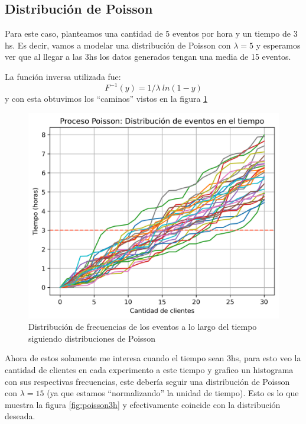 \documentclass[baaa]{baaa}
\begin{document}
\subsection{Distribución de Poisson}
Para este caso, planteamos una cantidad de 5 eventos por hora y un tiempo de 3 hs.
Es decir, vamos a modelar una distribución de Poisson con $\lambda=5$ y esperamos ver que al llegar a las 3hs los datos generados tengan una media de 15 eventos.

La función inversa utilizada fue: \[F^{-1}(y)=1/\lambda\:ln(1-y) \] y con esta obtuvimos los ``caminos'' vistos en la figura \ref{fig:poisson}

\begin{figure}[h]
    \centering
    \includegraphics[width=\linewidth]{imagenes/poisson.png}
    \caption{Distribución de frecuencias de los eventos a lo largo del tiempo siguiendo distribuciones de Poisson}
    \label{fig:poisson}
\end{figure}
Ahora de estos solamente me interesa cuando el tiempo sean 3hs, para esto veo la cantidad de clientes en cada experimento a este tiempo y grafico un histograma con sus respectivas frecuencias, este debería seguir una distribución de Poisson con $\lambda=15$ (ya que estamos ``normalizando'' la unidad de tiempo). Esto es lo que muestra la figura \ref{fig:poisson3h} y efectivamente coincide con la distribución deseada.  
\end{document}
